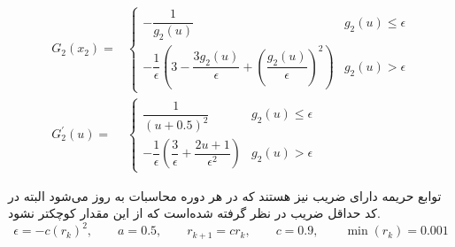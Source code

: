 \documentclass[12 pt]{article}
\begin{document}
\begin{align*}
	G_2(x_2) = &
	\begin{cases}
		-\dfrac{1}{g_2(u)}&  g_2(u) \leq \epsilon \\[1em]
		-\dfrac{1}{\epsilon}\left(3 - \dfrac{3g_2(u)}{\epsilon} + \left(\dfrac{g_2(u)}{\epsilon}\right)^2\right) &  g_2(u) > \epsilon
	\end{cases} \\
	G_2^\prime(u) = &
	\begin{cases}
		\dfrac{1}{(u + 0.5)^2}&  g_2(u) \leq \epsilon \\[1em]
		-\dfrac{1}{\epsilon}\left(\dfrac{3}{\epsilon} + \dfrac{2u+1}{\epsilon^2} \right) &  g_2(u) > \epsilon
	\end{cases} 
\end{align*}



توابع حریمه دارای ضریب نیز هستند که در هر دوره محاسبات به‌ روز می‌شود البته در کد حداقل ضریب   در نظر گرفته شده‌است که از این مقدار کوچکتر نشود.
$$
\epsilon = -c\left(r_k\right)^2,\qquad a = 0.5,\qquad r_{k+1} = cr_k,\qquad c = 0.9,
\qquad \min (r_k) = 0.001
$$
\end{document}
